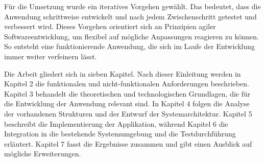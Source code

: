 Für die Umsetzung wurde ein iteratives Vorgehen gewählt.
Das bedeutet, dass die Anwendung schrittweise entwickelt und nach jedem Zwischenschritt getestet und verbessert wird.
Dieses Vorgehen orientiert sich an Prinzipien agiler Softwareentwicklung, um flexibel auf mögliche Anpassungen reagieren zu können.
So entsteht eine funktionierende Anwendung, die sich im Laufe der Entwicklung immer weiter verfeinern lässt.

Die Arbeit gliedert sich in sieben Kapitel.
Nach dieser Einleitung werden in Kapitel 2 die funktionalen und nicht-funktionalen Anforderungen beschrieben.
Kapitel 3 behandelt die theoretischen und technologischen Grundlagen, die für die Entwicklung der Anwendung relevant sind.
In Kapitel 4 folgen die Analyse der vorhandenen Strukturen und der Entwurf der Systemarchitektur.
Kapitel 5 beschreibt die Implementierung der Applikation, während Kapitel 6 die Integration in die bestehende Systemumgebung und die Testdurchführung erläutert.
Kapitel 7 fasst die Ergebnisse zusammen und gibt einen Ausblick auf mögliche Erweiterungen.

















